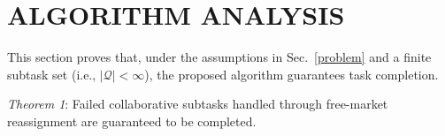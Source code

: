 \documentclass[lettersize,journal]{IEEEtran}
\begin{document}
\section{ALGORITHM ANALYSIS} \label{analysis}
This section proves that, under the assumptions in Sec.~\ref{problem} and a finite subtask set (i.e., $|\mathcal{Q}|<\infty$), the proposed algorithm guarantees task completion.

\textit{Theorem 1}: Failed collaborative subtasks handled through free-market reassignment are guaranteed to be completed.
\end{document}
